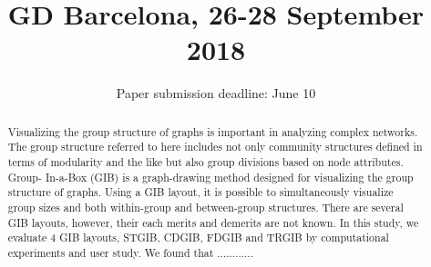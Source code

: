 \documentclass{llncs}
\begin{document}

\title{GD Barcelona, 26-28 September 2018}
%
%
\author{Paper submission deadline: June 10}
%
%
%

\maketitle              %

\begin{abstract}
Visualizing the group structure of graphs is important in analyzing complex networks. The group structure referred to here includes not only community structures defined in terms of modularity and the like but also group divisions based on node attributes. Group- In-a-Box (GIB) is a graph-drawing method designed for visualizing the group structure of graphs. Using a GIB layout, it is possible to simultaneously visualize group sizes and both within-group and between-group structures. There are several GIB layouts, however, their each merits and demerits are not known. In this study, we evaluate 4 GIB layouts, STGIB, CDGIB, FDGIB and TRGIB by computational experiments and user study. We found that ............

\end{abstract}

%
\end{document}
